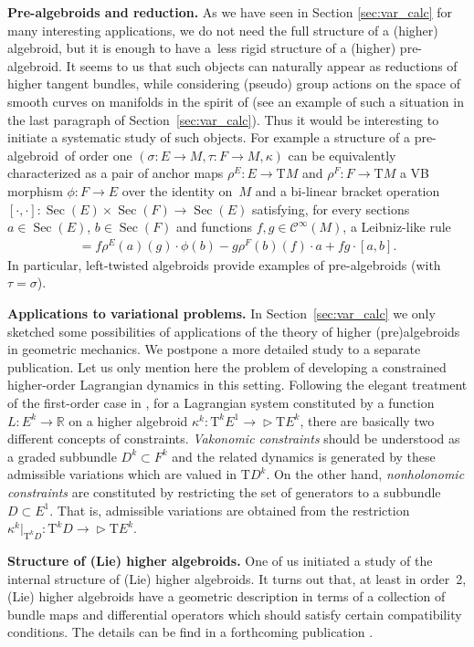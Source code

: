 \documentclass[10pt,a4paper]{amsart}
\newcommand{\degree}{{order}}
\newcommand{\R}{\mathbb{R}}
\newcommand{\Sec}{\operatorname{Sec}}
\newcommand{\ra}{\rightarrow}
\newcommand{\prealg}{pre-algebroid} %
\newcommand{\Prealg}{Pre-algebroid}
\newcommand{\T}{\mathrm{T}} %
\newcommand{\Cf}{\mathcal{C}^\infty}
\def\relto{\rightarrow\!\!\vartriangleright} %
\numberwithin{equation}{section}
\theoremstyle{definition}
\begin{document}
{\bf \Prealg s and reduction.} As we have seen in Section \ref{sec:var_calc} for many interesting applications, we do not need the full structure of a (higher) algebroid, but it is enough to have a~less rigid structure of a (higher) \prealg . It seems to us that such objects can na\-tu\-rally appear as reductions of higher tangent bundles, while considering (pseudo) group actions on the space of smooth curves on manifolds in the spirit of \cite{Kruglikov_Lychagin_2015} (see an example of such a situation in the last paragraph of Section~\ref{sec:var_calc}). Thus it would be interesting to ini\-tiate a systematic study of such objects. For example a structure of a \prealg\ of order one $(\sigma\colon E\ra M, \tau\colon F\ra M, \kappa)$ can be equivalently characterized as a pair of anchor maps $\rho^E\colon E\ra \T M $ and $\rho^F\colon F\ra \T M$ a VB morphism $\phi\colon F\ra E$ over the identity on~$M$ and a bi-linear bracket operation $[\cdot, \cdot]\colon \Sec(E)\times \Sec(F)\ra \Sec(E)$ satisfying, for every sections $a\in\Sec(E)$, $b\in\Sec(F)$ and functions $f,g\in\Cf(M)$, a Leibniz-like rule
\begin{gather*}[f\cdot a,g\cdot b]=f\rho^E(a)(g)\cdot\phi(b)-g\rho^F(b)(f)\cdot a+fg\cdot[a,b].\end{gather*}
In particular, left-twisted algebroids provide examples of \prealg s (with $\tau=\sigma$).

{\bf Applications to variational problems.} In Section~\ref{sec:var_calc} we only sketched some possibilities of applications of the theory of higher (pre)algebroids in geometric mechanics. We postpone a more detailed study to a separate publication. Let us only mention here the problem of developing a constrained higher-order Lagrangian dynamics in this setting. Following the elegant treatment of the first-order case in \cite{GG_var_calc_gen_alg_2008}, for a Lagrangian system constituted by a function $L\colon E^k\ra\R$ on a higher algebroid $\kappa^k\colon \T^k E^1\relto \T E^k$, there are basically two different concepts of constraints. \emph{Vakonomic constraints} should be understood as a graded subbundle $D^k\subset F^k$ and the related dynamics is generated by these admissible variations which are valued in $\T D^k$. On the other hand, \emph{nonholonomic constraints} are constituted by restricting the set of generators to a subbundle $D\subset E^1$. That is, admissible variations are obtained from the restriction $\kappa^k|_{\T^k D}\colon \T^k D\relto \T E^k$.

{\bf Structure of (Lie) higher algebroids.} One of us initiated a study of the internal structure of (Lie) higher algebroids. It turns out that, at least in \degree\ 2, (Lie) higher algebroids have a geometric description in terms of a collection of bundle maps and differential operators which should satisfy certain compatibility conditions. The details can be find in a forthcoming publication \cite{Rotkiewicz_aha}.
\end{document}
